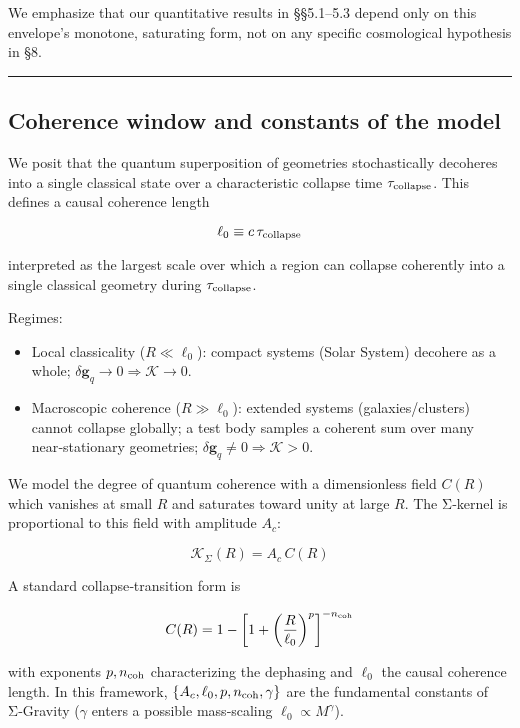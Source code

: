 \documentclass[11pt,a4paper]{article}
\begin{document}
We emphasize that our quantitative results in §§5.1–5.3 depend only on this envelope's monotone, saturating form, not on any specific cosmological hypothesis in §8.


\medskip\hrule\medskip


\subsection{Coherence window and constants of the model}


We posit that the quantum superposition of geometries stochastically decoheres into a single classical state over a characteristic collapse time $\tau_{\rm collapse}$. This defines a causal coherence length


\begin{equation}
\ell_0 \equiv c\,\tau_{\rm collapse}
\end{equation}


interpreted as the largest scale over which a region can collapse coherently into a single classical geometry during $\tau_{\rm collapse}$.


Regimes:

\begin{itemize}
\item Local classicality ($R\ll\ell_0$): compact systems (Solar System) decohere as a whole; $\delta\mathbf{g}_q\to0\Rightarrow \mathcal{K}\to0$.
\item Macroscopic coherence ($R\gg\ell_0$): extended systems (galaxies/clusters) cannot collapse globally; a test body samples a coherent sum over many near‑stationary geometries; $\delta\mathbf{g}_q\ne0\Rightarrow \mathcal{K}>0$.
\end{itemize}


We model the degree of quantum coherence with a dimensionless field $C(R)$ which vanishes at small $R$ and saturates toward unity at large $R$. The Σ‑kernel is proportional to this field with amplitude $A_c$:


\begin{equation}
\mathcal{K}_\Sigma(R) = A_c\,C(R)
\end{equation}


A standard collapse‑transition form is


\begin{equation}
C(R) = 1 - \left[1 + \left(\frac{R}{\ell_0}\right)^p\right]^{-n_{\rm coh}}
\end{equation}


with exponents $p,n_{\rm coh}$ characterizing the dephasing and $\ell_0$ the causal coherence length. In this framework, $\{A_c,\ell_0,p,n_{\rm coh},\gamma\}$ are the fundamental constants of Σ‑Gravity ($\gamma$ enters a possible mass‑scaling $\ell_0\propto M^{\gamma}$).
\end{document}
